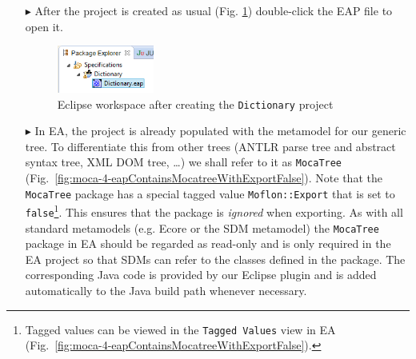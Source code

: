 \begin{enumerate}
\clearpage

\item[$\blacktriangleright$] After the project is created as usual (Fig. \ref{fig:moca-3-WizardResult}) double-click the EAP file to open it.

\begin{figure}[!htbp]
\begin{center}
 \includegraphics[width=0.3\textwidth]{pics/moca/1DictionaryMetaModel/3-WizardResult}
  \caption{Eclipse workspace after creating the \texttt{Dictionary} project}
  \label{fig:moca-3-WizardResult}
\end{center}
\end{figure}

\item[$\blacktriangleright$] In EA, the project is already populated with the metamodel for our generic tree.
To differentiate this from other trees (ANTLR parse tree and abstract syntax tree, XML DOM tree, \ldots) we shall refer to it as \texttt{MocaTree} (Fig.~\ref{fig:moca-4-eapContainsMocatreeWithExportFalse}).
Note that the \texttt{MocaTree} package has a special tagged value \texttt{Moflon::Export} that is set to \texttt{false}\footnote{Tagged values can be viewed in the \texttt{Tagged Values} view in EA (Fig.~\ref{fig:moca-4-eapContainsMocatreeWithExportFalse}).}.
This ensures that the package is \emph{ignored} when exporting.
As with all standard metamodels (e.g. Ecore or the SDM metamodel) the \texttt{MocaTree} package in EA should be regarded as read-only and is only required in the EA project so that SDMs can refer to the classes defined in the package.
The corresponding Java code is provided by our Eclipse plugin and is added automatically to the Java build path whenever necessary.


\end{enumerate}
